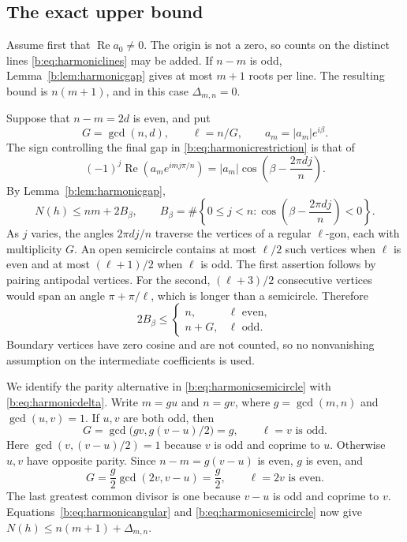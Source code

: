 \documentclass[UTF8,11pt]{ctexart}
\theoremstyle{definition}
\numberwithin{equation}{section}
\DeclareMathOperator{\Rea}{Re}\DeclareMathOperator{\Ima}{Im}
\begin{document}
\subsection{The exact upper bound}
Assume first that $\Rea a_0\ne0$. The origin is not a zero, so
counts on the distinct lines \eqref{b:eq:harmoniclines} may be added.
If $n-m$ is odd, Lemma~\ref{b:lem:harmonicgap} gives at most $m+1$
roots per line. The resulting bound is $n(m+1)$, and in this case
$\Delta_{m,n}=0$.

Suppose that $n-m=2d$ is even, and put
\[
 G=\gcd(n,d),\qquad \ell=n/G,\qquad a_m=|a_m|e^{i\beta}.
\]
The sign controlling the final gap in
\eqref{b:eq:harmonicrestriction} is that of
\[
 (-1)^j\Rea(a_me^{imj\pi/n})
 =|a_m|\cos\left(\beta-\frac{2\pi dj}{n}\right).
\]
By Lemma~\ref{b:lem:harmonicgap},
\begin{equation}\label{b:eq:harmonicangular}
 N(h)\le nm+2B_\beta,\qquad
 B_\beta=\#\left\{0\le j<n:
       \cos\left(\beta-\frac{2\pi dj}{n}\right)<0\right\}.
\end{equation}
As $j$ varies, the angles $2\pi dj/n$ traverse the vertices of a
regular $\ell$-gon, each with multiplicity $G$.
An open semicircle contains at most $\ell/2$ such vertices when
$\ell$ is even and at most $(\ell+1)/2$ when $\ell$ is odd.
The first assertion follows by pairing antipodal vertices. For the
second, $(\ell+3)/2$ consecutive vertices would span an angle
$\pi+\pi/\ell$, which is longer than a semicircle. Therefore
\begin{equation}\label{b:eq:harmonicsemicircle}
 2B_\beta\le
 \begin{cases}
  n,&\ell\text{ even},\\
  n+G,&\ell\text{ odd}.
 \end{cases}
\end{equation}
Boundary vertices have zero cosine and are not counted, so no
nonvanishing assumption on the intermediate coefficients is used.

We identify the parity alternative in \eqref{b:eq:harmonicsemicircle}
with \eqref{b:eq:harmonicdelta}. Write $m=gu$ and $n=gv$, where
$g=\gcd(m,n)$ and $\gcd(u,v)=1$. If $u,v$ are both odd, then
\[
 G=\gcd\bigl(gv,g(v-u)/2\bigr)=g,\qquad \ell=v\text{ is odd}.
\]
Here $\gcd(v,(v-u)/2)=1$ because $v$ is odd and coprime to $u$.
Otherwise $u,v$ have opposite parity. Since $n-m=g(v-u)$ is even,
$g$ is even, and
\[
 G=\frac g2\gcd(2v,v-u)=\frac g2,\qquad \ell=2v\text{ is even}.
\]
The last greatest common divisor is one because $v-u$ is odd and
coprime to $v$. Equations~\eqref{b:eq:harmonicangular} and
\eqref{b:eq:harmonicsemicircle} now give
$N(h)\le n(m+1)+\Delta_{m,n}$.
\end{document}

